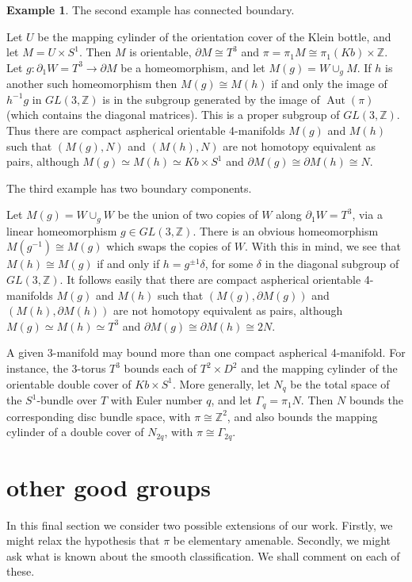 \documentclass[12pt]{amsart}
\theoremstyle{definition}
\newtheorem{example}[theorem]{Example}
\DeclareMathOperator{\Aut}{Aut}
\begin{document}
\begin{example}
The second example has connected boundary.

Let $U$ be the mapping cylinder of the orientation cover of the Klein bottle,
and let $M=U\times{S^1}$. 
Then $M$ is orientable,
$\partial{M}\cong{T^3}$ and $\pi=\pi_1M\cong\pi_1(Kb)\times\mathbb{Z}$.
Let $g:\partial_1W=T^3\to\partial{M}$ be a homeomorphism, 
and let $M(g)=W\cup_gM$.
If $h$ is another such homeomorphism then $M(g)\cong{M(h)}$ 
if and only the image of $h^{-1}g$ in $GL(3,\mathbb{Z})$ is in 
the subgroup generated by the image of $\Aut(\pi)$ 
(which contains the diagonal matrices).
This is a proper subgroup of $GL(3,\mathbb{Z})$.
Thus there are compact aspherical orientable 4-manifolds $M(g)$ and $M(h)$ 
such that $(M(g),N)$ and $(M(h),N)$ are not homotopy equivalent as pairs,
although $M(g)\simeq{M(h)}\simeq{Kb}\times{S^1}$ and 
$\partial{M(g)}\cong\partial{M(h)}\cong{N}$.

The third example has two boundary components.

Let $M(g)=W\cup_gW$ be the union of two copies of $W$ along 
$\partial_1W=T^3$, 
via a linear homeomorphism $g\in{GL(3,\mathbb{Z})}$.
There is an obvious homeomorphism $M(g^{-1})\cong{M(g)}$
which swaps the copies of $W$.
With this in mind, 
we see that $M(h)\cong{M(g)}$ if and only if $h=g^{\pm1}\delta$,
for some  $\delta$ in the diagonal subgroup of $GL(3,\mathbb{Z})$.
It follows easily that there are compact aspherical orientable 4-manifolds 
$M(g)$ and $M(h)$ such that $(M(g),\partial{M(g)})$ and 
$(M(h),\partial{M(h)})$ are not homotopy equivalent as pairs,
although $M(g)\simeq{M(h)}\simeq{T^3}$ and 
$\partial{M(g)}\cong\partial{M(h)}\cong2N$.
\end{example}

\medskip
A given 3-manifold may bound more than one compact aspherical 4-manifold.
For instance,  the 3-torus $T^3$ bounds each of $T^2\times{D^2}$ and the mapping
cylinder of the orientable double cover of $Kb\times{S^1}$.
More generally, let $N_q$ be the total space of the $S^1$-bundle over $T$
with Euler number $q$, and let $\Gamma_q=\pi_1N$.
Then $N$ bounds the corresponding disc bundle space, with $\pi\cong\mathbb{Z}^2$,
and also bounds the mapping cylinder of a double cover of $N_{2q}$,
with $\pi\cong\Gamma_{2q}$.

\section{other good groups}

In this final section we consider two possible extensions of our work.
Firstly, we might relax the hypothesis that $\pi$ be elementary amenable.
Secondly, we might ask what is known about the smooth classification.
We shall comment on each of these.
\end{document}
